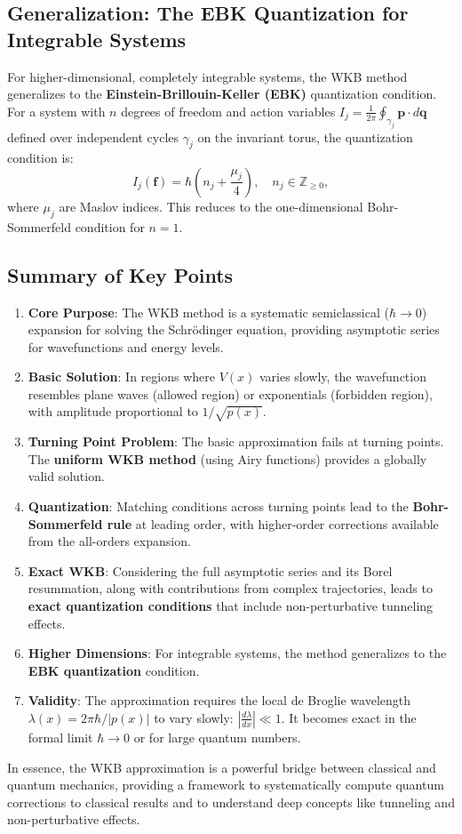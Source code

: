 \subsection{Generalization: The EBK Quantization for Integrable Systems}
For higher-dimensional, completely integrable systems, the WKB method generalizes to the \textbf{Einstein-Brillouin-Keller (EBK)} quantization condition. For a system with $n$ degrees of freedom and action variables $I_j = \frac{1}{2\pi}\oint_{\gamma_j} \mathbf{p} \cdot d\mathbf{q}$ defined over independent cycles $\gamma_j$ on the invariant torus, the quantization condition is:
\[
I_j(\mathbf{f}) = \hbar \left( n_j + \frac{\mu_j}{4} \right), \quad n_j \in \mathbb{Z}_{\ge 0},
\]
where $\mu_j$ are Maslov indices. This reduces to the one-dimensional Bohr-Sommerfeld condition for $n=1$.

\subsection{Summary of Key Points}
\begin{enumerate}
	\item \textbf{Core Purpose}: The WKB method is a systematic semiclassical ($\hbar \to 0$) expansion for solving the Schr\"odinger equation, providing asymptotic series for wavefunctions and energy levels.
	\item \textbf{Basic Solution}: In regions where $V(x)$ varies slowly, the wavefunction resembles plane waves (allowed region) or exponentials (forbidden region), with amplitude proportional to $1/\sqrt{p(x)}$.
	\item \textbf{Turning Point Problem}: The basic approximation fails at turning points. The \textbf{uniform WKB method} (using Airy functions) provides a globally valid solution.
	\item \textbf{Quantization}: Matching conditions across turning points lead to the \textbf{Bohr-Sommerfeld rule} at leading order, with higher-order corrections available from the all-orders expansion.
	\item \textbf{Exact WKB}: Considering the full asymptotic series and its Borel resummation, along with contributions from complex trajectories, leads to \textbf{exact quantization conditions} that include non-perturbative tunneling effects.
	\item \textbf{Higher Dimensions}: For integrable systems, the method generalizes to the \textbf{EBK quantization} condition.
	\item \textbf{Validity}: The approximation requires the local de Broglie wavelength $\lambda(x) = 2\pi\hbar/|p(x)|$ to vary slowly: $\left| \frac{d\lambda}{dx} \right| \ll 1$. It becomes exact in the formal limit $\hbar \to 0$ or for large quantum numbers.
\end{enumerate}

In essence, the WKB approximation is a powerful bridge between classical and quantum mechanics, providing a framework to systematically compute quantum corrections to classical results and to understand deep concepts like tunneling and non-perturbative effects.